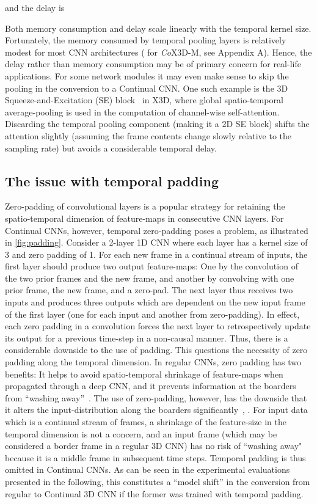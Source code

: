 \documentclass[runningheads]{llncs}
\begin{document}
and the delay is

Both memory consumption and delay scale linearly with the temporal kernel size.
Fortunately, the memory consumed by temporal pooling layers is relatively modest for most CNN architectures ( for \textit{Co}X3D-M, see Appendix A). Hence, the delay rather than memory consumption may be of primary concern for real-life applications.
For some network modules it may even make sense to skip the pooling in the conversion to a Continual CNN.
One such example is the 3D Squeeze-and-Excitation (SE) block~\cite{hu2018squeeze} in X3D, where global spatio-temporal average-pooling is used in the computation of channel-wise self-attention. 
Discarding the temporal pooling component (making it a 2D SE block) shifts the attention slightly (assuming the frame contents change slowly relative to the sampling rate) but avoids a considerable temporal delay.



\subsection{The issue with temporal padding}
Zero-padding of convolutional layers is a popular strategy for retaining the spatio-temporal dimension of feature-maps in consecutive CNN layers.
For Continual CNNs, however, temporal zero-padding poses a problem, as illustrated in \cref{fig:padding}. 
Consider a 2-layer 1D CNN where each layer has a kernel size of 3 and zero padding of 1.
For each new frame in a continual stream of inputs, the first layer  should produce two output feature-maps: One by the convolution of the two prior frames and the new frame, and another by convolving with one prior frame, the new frame, and a zero-pad. The next layer  thus receives two inputs and produces three outputs which are dependent on the new input frame of the first layer (one for each input and another from zero-padding).
In effect, each zero padding in a convolution forces the next layer to retrospectively update its output for a previous time-step in a non-causal manner.
Thus, there is a considerable downside to the use of padding.
This questions the necessity of zero padding along the temporal dimension.
In regular CNNs, zero padding has two benefits:
It helps to avoid spatio-temporal shrinkage of feature-maps when propagated through a deep CNN,
and it prevents information at the boarders from ``washing away''~\cite{karpathy2020cs231n}.
The use of zero-padding, however, has the downside that it alters the input-distribution along the boarders significantly~\cite{liu2018partialpadding}, \cite{nguyen2019distribution}. 
For input data which is a continual stream of frames, a shrinkage of the feature-size in the temporal dimension is not a concern, and an input frame (which may be considered a border frame in a regular 3D CNN) has no risk of ``washing away" because it is a middle frame in subsequent time steps.
Temporal padding is thus omitted in Continual CNNs.
As can be seen in the experimental evaluations presented in the following, this constitutes a ``model shift'' in the conversion from regular to Continual 3D CNN if the former was trained with temporal padding.
\end{document}
